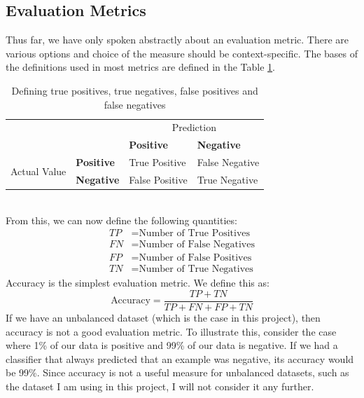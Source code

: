 \documentclass[12pt,a4paper,twoside,openright]{report}
\begin{document}
\subsection{Evaluation Metrics} \label{evaluation-metrics}
Thus far, we have only spoken abstractly about an evaluation metric. There are various options and choice of the measure should be context-specific. The bases of the definitions used in most metrics are defined in the Table \ref{table:true-positives}.
\\
\begin{table}[]
	\centering
	\label{table:true-positives}
	\begin{tabular}{llll}
		&                                                                    & \multicolumn{2}{c}{Prediction} \\
		& \multicolumn{1}{l|}{}                                              & \textbf{Positive}  & \textbf{Negative}  \\ \cline{2-4} 
		\multirow{2}{*}{Actual Value}&\multicolumn{1}{l|}{\textbf{Positive}} & True Positive      & False Negative     \\
		& \multicolumn{1}{l|}{\textbf{Negative}}                             & False Positive     & True Negative     
	\end{tabular}
	\caption{Defining true positives, true negatives, false positives and false negatives}
\end{table}
\\
From this, we can now define the following quantities:
\begin{align}
	TP & = \text{Number of True Positives} \\
	FN & = \text{Number of False Negatives} \\
	FP & = \text{Number of False Positives} \\
	TN & = \text{Number of True Negatives}
\end{align}
Accuracy is the simplest evaluation metric. We define this as:
\begin{equation}
	\text{Accuracy} = \frac{TP + TN}{TP + FN + FP + TN}
\end{equation}
If we have an unbalanced dataset (which is the case in this project), then accuracy is not a good evaluation metric. To illustrate this, consider the case where 1\% of our data is positive and 99\% of our data is negative. If we had a classifier that always predicted that an example was negative, its accuracy would be 99\%. Since accuracy is not a useful measure for unbalanced datasets, such as the dataset I am using in this project, I will not consider it any further.
\end{document}
